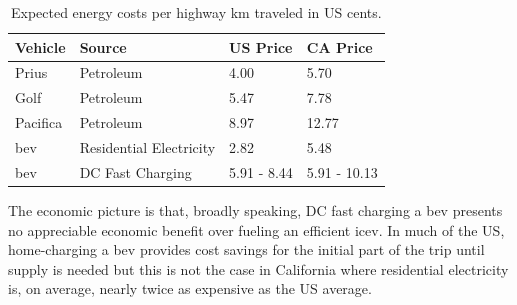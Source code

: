 \documentclass[11pt]{article}
\begin{document}
\begin{multicols}{2}
\begin{table}[H]
	\centering
	\caption{Expected energy costs per highway km traveled in US cents.}
	\label{tab:expected_energy_costs_per_km}
	\begin{tabular}{|C{\linewidth / 4}|C{\linewidth / 4}|C{\linewidth / 4}|C{\linewidth / 4}|}
		\hline Vehicle & Source & US Price & CA Price \\
		\hline Prius & Petroleum & 4.00 & 5.70 \\
		\hline Golf & Petroleum & 5.47 & 7.78 \\
		\hline Pacifica & Petroleum & 8.97 & 12.77 \\
		\hline \gls{bev} & Residential Electricity & 2.82 & 5.48 \\
		\hline \gls{bev} & DC Fast Charging & 5.91 - 8.44 & 5.91 - 10.13 \\
		\hline
	\end{tabular}
\end{table}

The economic picture is that, broadly speaking, DC fast charging a \gls{bev} presents no appreciable economic benefit over fueling an efficient \gls{icev}. In much of the US, home-charging a \gls{bev} provides cost savings for the initial part of the trip until supply is needed but this is not the case in California where residential electricity is, on average, nearly twice as expensive as the US average.




 

\newpage

\printbibliography

\appendix


\end{multicols}
\end{document}
